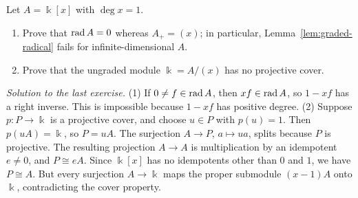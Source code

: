 \begin{exercise}
Let $A=\Bbbk[x]$ with $\deg x=1$.
\begin{enumerate}
\item Prove that $\operatorname{rad}\nolimits A=0$ whereas $A_+=(x)$; in particular, Lemma~\ref{lem:graded-radical} fails for infinite-dimensional $A$.
\item Prove that the ungraded module $\Bbbk=A/(x)$ has no projective cover.
\end{enumerate}
\end{exercise}

\begin{hidden}
\emph{Solution to the last exercise.}
(1) If $0\neq f\in\operatorname{rad}\nolimits A$, then $xf\in\operatorname{rad}\nolimits A$, so $1-xf$ has a right inverse.
This is impossible because $1-xf$ has positive degree.
(2) Suppose $p:P\to\Bbbk$ is a projective cover, and choose $u\in P$ with $p(u)=1$.
Then $p(uA)=\Bbbk$, so $P=uA$.
The surjection $A\to P$, $a\mapsto ua$, splits because $P$ is projective.
The resulting projection $A\to A$ is multiplication by an idempotent $e\neq0$, and $P\cong eA$.
Since $\Bbbk[x]$ has no idempotents other than $0$ and $1$, we have $P\cong A$.
But every surjection $A\to\Bbbk$ maps the proper submodule $(x-1)A$ onto $\Bbbk$, contradicting the cover property.
\end{hidden}
